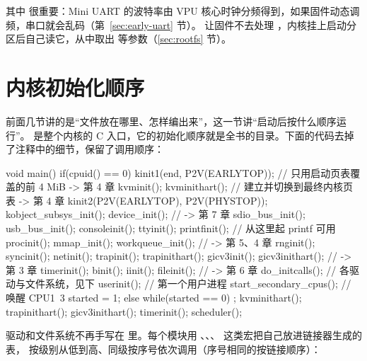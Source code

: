 其中  很重要：Mini UART 的波特率由 VPU 核心时钟分频得到，如果固件动态调频，串口就会乱码（第~\ref{sec:early-uart} 节）。 让固件不去处理 ，内核挂上启动分区后自己读它，从中取出  等参数（\ref{sec:rootfs} 节）。

\section{内核初始化顺序}
\label{sec:init-order}

前面几节讲的是“文件放在哪里、怎样编出来”，这一节讲“启动后按什么顺序运行”。 是整个内核的 C 入口，它的初始化顺序就是全书的目录。下面的代码去掉了注释中的细节，保留了调用顺序：

\begin{ccode}
void main() {
  if(cpuid() == 0){
    kinit1(end, P2V(EARLYTOP));  // 只用启动页表覆盖的前 4 MiB    -> 第 4 章
    kvminit();  kvminithart();   // 建立并切换到最终内核页表      -> 第 4 章
    kinit2(P2V(EARLYTOP), P2V(PHYSTOP));
    kobject_subsys_init(); device_init();                       // -> 第 7 章
    sdio_bus_init(); usb_bus_init();
    consoleinit(); ttyinit(); printfinit();                     // 从这里起 printf 可用
    procinit(); mmap_init(); workqueue_init();                  // -> 第 5、4 章
    rnginit(); syncinit(); netinit();
    trapinit(); trapinithart(); gicv3init(); gicv3inithart();   // -> 第 3 章
    timerinit();
    binit(); iinit(); fileinit();                               // -> 第 6 章
    do_initcalls();                                             // 各驱动与文件系统，见下
    userinit();                                                 // 第一个用户进程
    start_secondary_cpus();                                     // 唤醒 CPU1~3
    started = 1;
  } else {
    while(started == 0) ;
    kvminithart(); trapinithart(); gicv3inithart(); timerinit();
  }
  scheduler();
}
\end{ccode}

驱动和文件系统不再手写在  里。每个模块用 、、、 这类宏把自己放进链接器生成的  表， 按级别从低到高、同级按序号依次调用（序号相同的按链接顺序）：

